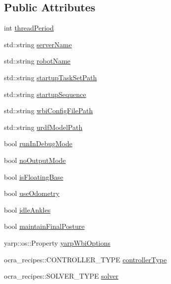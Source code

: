 \subsection*{Public Attributes}
\begin{DoxyCompactItemize}
\item 
int \hyperlink{classOcraControllerOptions_ab706ae593bf5b30433cfd6f957b51db4}{thread\+Period}
\item 
std\+::string \hyperlink{classOcraControllerOptions_a22380b083fbf0b202993d0415d1d4c83}{server\+Name}
\item 
std\+::string \hyperlink{classOcraControllerOptions_a897948011f23b08ba20e1707033458d4}{robot\+Name}
\item 
std\+::string \hyperlink{classOcraControllerOptions_af91566ecff3f7ed02571369c7af061ce}{startup\+Task\+Set\+Path}
\item 
std\+::string \hyperlink{classOcraControllerOptions_ab01efbd786ad8bc5beb6de02dbcd0936}{startup\+Sequence}
\item 
std\+::string \hyperlink{classOcraControllerOptions_af3a98210531cf667c2838e45b470a66e}{wbi\+Config\+File\+Path}
\item 
std\+::string \hyperlink{classOcraControllerOptions_a697196e6267b2a519dd0bcc2bc03ab73}{urdf\+Model\+Path}
\item 
bool \hyperlink{classOcraControllerOptions_a26dce90c0e6cf7ba608020d01cd08f3c}{run\+In\+Debug\+Mode}
\item 
bool \hyperlink{classOcraControllerOptions_af05db2783f36f469fa535fd4ba5c12b1}{no\+Output\+Mode}
\item 
bool \hyperlink{classOcraControllerOptions_a1edf322553d88c1ac2bf8947e9d942d7}{is\+Floating\+Base}
\item 
bool \hyperlink{classOcraControllerOptions_a335f09b446b6d10e2a8e6eb453391d9e}{use\+Odometry}
\item 
bool \hyperlink{classOcraControllerOptions_a34c0a162302f4f2c462d9ce4818292d5}{idle\+Ankles}
\item 
bool \hyperlink{classOcraControllerOptions_ae7b16a5b8264abd18ee8761eb1091ccf}{maintain\+Final\+Posture}
\item 
yarp\+::os\+::\+Property \hyperlink{classOcraControllerOptions_ac3965bdcce6cb2ce3e4a335f855acd63}{yarp\+Wbi\+Options}
\item 
ocra\+\_\+recipes\+::\+C\+O\+N\+T\+R\+O\+L\+L\+E\+R\+\_\+\+T\+Y\+PE \hyperlink{classOcraControllerOptions_aa533fe11c53b7fb17105f1edf48e1c0d}{controller\+Type}
\item 
ocra\+\_\+recipes\+::\+S\+O\+L\+V\+E\+R\+\_\+\+T\+Y\+PE \hyperlink{classOcraControllerOptions_af79b8705c3f3097b642262bc877eaa8e}{solver}
\end{DoxyCompactItemize}


